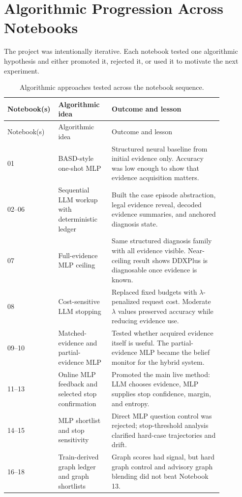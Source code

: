 \documentclass[11pt]{article}
\begin{document}
\section{Algorithmic Progression Across Notebooks}

The project was intentionally iterative. Each notebook tested one algorithmic hypothesis and either promoted it, rejected it, or used it to motivate the next experiment.

\begin{longtable}{p{0.13\linewidth} p{0.24\linewidth} p{0.50\linewidth}}
\caption{Algorithmic approaches tested across the notebook sequence.}\\
\toprule
Notebook(s) & Algorithmic idea & Outcome and lesson \\
\midrule
\endfirsthead
\toprule
Notebook(s) & Algorithmic idea & Outcome and lesson \\
\midrule
\endhead
01 & BASD-style one-shot MLP & Structured neural baseline from initial evidence only. Accuracy was low enough to show that evidence acquisition matters. \\
02--06 & Sequential LLM workup with deterministic ledger & Built the case episode abstraction, legal evidence reveal, decoded evidence summaries, and anchored diagnosis state. \\
07 & Full-evidence MLP ceiling & Same structured diagnosis family with all evidence visible. Near-ceiling result shows DDXPlus is diagnosable once evidence is known. \\
08 & Cost-sensitive LLM stopping & Replaced fixed budgets with $\lambda$-penalized request cost. Moderate $\lambda$ values preserved accuracy while reducing evidence use. \\
09--10 & Matched-evidence and partial-evidence MLP & Tested whether acquired evidence itself is useful. The partial-evidence MLP became the belief monitor for the hybrid system. \\
11--13 & Online MLP feedback and selected stop confirmation & Promoted the main live method: LLM chooses evidence, MLP supplies stop confidence, margin, and entropy. \\
14--15 & MLP shortlist and stop sensitivity & Direct MLP question control was rejected; stop-threshold analysis clarified hard-case trajectories and drift. \\
16--18 & Train-derived graph ledger and graph shortlists & Graph scores had signal, but hard graph control and advisory graph blending did not beat Notebook 13. \\

\end{longtable}
\end{document}
